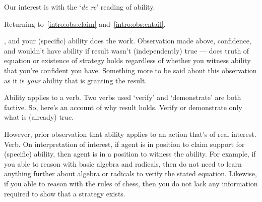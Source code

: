 \begin{note}
  Our interest is with the `\emph{de re}' reading of ability.


  Returning to~\ref{intro:obs:claim} and~\ref{intro:obs:entail}.

  \gsi{}, and your (specific) ability does the work.
  Observation made above, confidence, and wouldn't have ability if result wasn't (independently) true --- does truth of equation or existence of strategy holds regardless of whether you witness ability that you're confident you have.
  Something more to be said about this observation as it is \emph{your} ability that is granting the result.

  Ability applies to a verb.
  Two verbs used `verify' and `demonstrate' are both factive.
  So, here's an account of why result holds.
  Verify or demonstrate only what is (already) true.

  However, prior observation that ability applies to an action that's of real interest.
  Verb.
  On interpretation of interest, if agent is in position to claim support for (specific) ability, then agent is in a position to witness the ability.
  For example, if you able to reason with basic algebra and radicals, then do not need to learn anything further about algebra or radicals to verify the stated equation.
  Likewise, if you able to reason with the rules of chess, then you do not lack any information required to show that a strategy exists.


\end{note}
